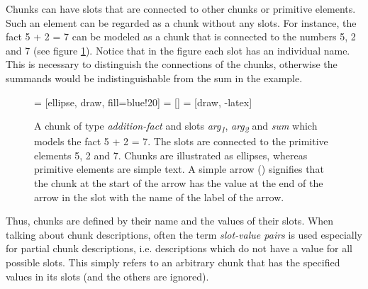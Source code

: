 Chunks can have slots that are connected to other chunks or primitive elements. Such an element can be regarded as a chunk without any slots. For instance, the fact 5 + 2 = 7 can be modeled as a chunk that is connected to the numbers 5, 2 and 7 (see figure \ref{fig:chunk_addition_fact}). Notice that in the figure each slot has an individual name. This is necessary to distinguish the connections of the chunks, otherwise the summands would be indistinguishable from the sum in the example.

\begin{figure}[hbt]
\centering
{} = [ellipse, draw, fill=blue!20]
 = [] 
 = [draw, -latex]   

\caption[A chunk of type \emph{addition-fact} and slots \emph{arg\textsubscript{1}}, \emph{arg\textsubscript{2}} and \emph{sum} which models the fact 5 + 2 = 7. The slots are connected to the primitive elements 5, 2 and 7.]{A chunk of type \emph{addition-fact} and slots \emph{arg\textsubscript{1}}, \emph{arg\textsubscript{2}} and \emph{sum} which models the fact 5 + 2 = 7. The slots are connected to the primitive elements 5, 2 and 7. Chunks are illustrated as ellipses, whereas primitive elements are simple text. A simple arrow () signifies that the chunk at the start of the arrow has the value at the end of the arrow in the slot with the name of the label of the arrow.}
\label{fig:chunk_addition_fact}
\end{figure}


Thus, chunks are defined by their name and the values of their slots. When talking about chunk descriptions, often the term \emph{slot-value pairs} is used especially for partial chunk descriptions, i.e. descriptions which do not have a value for all possible slots. This simply refers to an arbitrary chunk that has the specified values in its slots (and the others are ignored).


